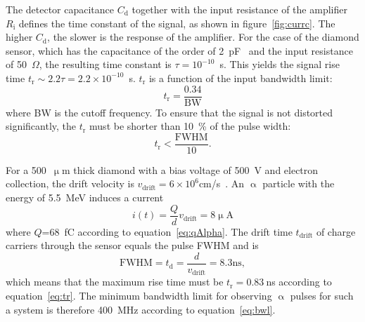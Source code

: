 The detector capacitance $C_\mathrm{d}$ together with the input resistance of the amplifier $R_\mathrm{i}$ defines the time constant of the signal, as shown in figure~\ref{fig:currc}. The higher $C_\mathrm{d}$, the slower is the response of the amplifier. For the case of the diamond sensor, which has the capacitance of the order of 2~pF~\cite{IIa:00001} and the input resistance of 50~$\Omega$, the resulting time constant is $\tau=10^{-10}$~s. This yields the signal rise time $t_\mathrm{r}\sim2.2\tau=2.2\times10^{-10}$~s. $t_\mathrm{r}$ is a function of the input bandwidth limit:
\begin{equation}
\label{eq:bwl}
t_\mathrm{r}=\frac{0.34}{\mathrm{BW}}
\end{equation}
where BW is the cutoff frequency. To ensure that the signal is not distorted significantly, the $t_\mathrm{r}$ must be shorter than 10~\% of the pulse width:
\begin{equation}
\label{eq:tr}
t_\mathrm{r} < \frac{\mathrm{FWHM}}{10}.
\end{equation}

For a 500~$\upmu$m thick diamond with a bias voltage of 500~V and electron collection, the drift velocity is $v_\mathrm{drift}=6\times10^6$cm/s~\cite{Jansen:1956431}. An $\upalpha$ particle with the energy of 5.5~MeV induces a current
\begin{equation}
i(t)=\frac{Q}{d}v_\mathrm{drift} = 8\mathrm{\upmu A}
\end{equation}
where $Q$=68~fC according to equation~\ref{eq:qAlpha}. The drift time $t_\mathrm{drift}$ of charge carriers through the sensor equals the pulse FWHM and is 
\begin{equation}
\mathrm{FWHM} = t_\mathrm{d}=\frac{d}{v_\mathrm{drift}} = 8.3\mathrm{ns},
\end{equation}
which means that the maximum rise time must be $t_\mathrm{r}=0.83~$ns according to equation~\ref{eq:tr}. The minimum bandwidth limit for observing $\upalpha$ pulses for such a system is therefore 400~MHz according to equation~\ref{eq:bwl}. 


